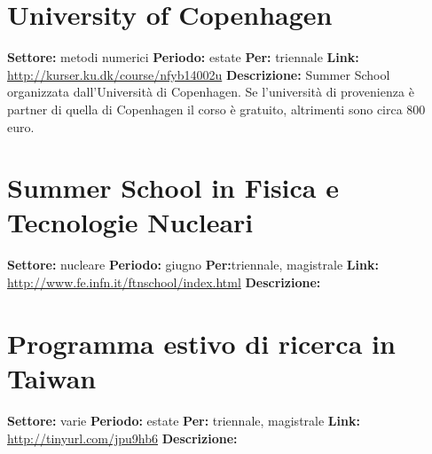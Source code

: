 \documentclass[a4paper,10pt]{article}
\begin{document}
 \section{University of Copenhagen }
 \textbf{Settore:} metodi numerici \newline
\textbf{Periodo:} estate\newline
\textbf{Per:} triennale\newline
\textbf{Link:} \url{http://kurser.ku.dk/course/nfyb14002u} \newline
\textbf{Descrizione:} Summer School organizzata dall'Università di Copenhagen. Se l'università di provenienza è partner di quella di Copenhagen il corso è gratuito, altrimenti sono circa 800 euro. 

 \section{Summer School in Fisica e Tecnologie Nucleari}
 \textbf{Settore:} nucleare\newline
\textbf{Periodo:} giugno \newline
\textbf{Per:}triennale, magistrale\newline
\textbf{Link:} \url{http://www.fe.infn.it/ftnschool/index.html} \newline
\textbf{Descrizione:} 

 \section{Programma estivo di ricerca in Taiwan}
 \textbf{Settore:} varie \newline
\textbf{Periodo:} estate\newline
\textbf{Per:} triennale, magistrale\newline
\textbf{Link:} \url{http://tinyurl.com/jpu9hb6} \newline
\textbf{Descrizione:} 
\end{document}
